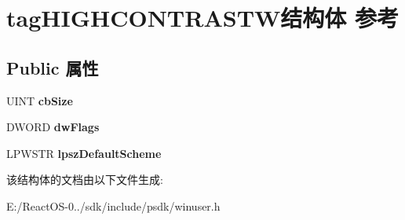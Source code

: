 \hypertarget{structtag_h_i_g_h_c_o_n_t_r_a_s_t_w}{}\section{tag\+H\+I\+G\+H\+C\+O\+N\+T\+R\+A\+S\+T\+W结构体 参考}
\label{structtag_h_i_g_h_c_o_n_t_r_a_s_t_w}
\subsection*{Public 属性}
\begin{DoxyCompactItemize}
\item 
\mbox{\label{structtag_h_i_g_h_c_o_n_t_r_a_s_t_w_a3ff002a0d68f351e159cfeb4d09f1c15}} 
U\+I\+NT {\bfseries cb\+Size}
\item 
\mbox{\label{structtag_h_i_g_h_c_o_n_t_r_a_s_t_w_a066e0fd7bf777796d4f04645342a7f16}} 
D\+W\+O\+RD {\bfseries dw\+Flags}
\item 
\mbox{\label{structtag_h_i_g_h_c_o_n_t_r_a_s_t_w_a604a2f539b2f56e1edd7a878d0fc39d5}} 
L\+P\+W\+S\+TR {\bfseries lpsz\+Default\+Scheme}
\end{DoxyCompactItemize}


该结构体的文档由以下文件生成\+:\begin{DoxyCompactItemize}
\item 
E\+:/\+React\+O\+S-\/0../sdk/include/psdk/winuser.\+h\end{DoxyCompactItemize}
